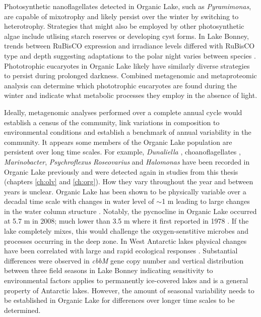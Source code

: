 Photosynthetic nanoflagellates detected in Organic Lake, such as \emph{Pyramimonas}, are capable of mixotrophy \cite{Bell2003} and likely persist over the winter by switching to heterotrophy.
Strategies that might also be employed by other photosynthetic algae include utlising starch reserves or developing cyst forms.
In Lake Bonney, trends between \acs{RuBisCO} expression and irradiance levels differed with \acs{RuBisCO} type and depth suggesting adaptations to the polar night varies between species \cite{Kong2012a}.
Phototrophic eucaryotes in Organic Lake likely have similarly diverse strategies to persist during prolonged darkness.
Combined metagenomic and metaproteomic analysis can determine which phototrophic eucaryotes are found during the winter and indicate what metabolic processes they employ in the absence of light.

Ideally, metagenomic analyses performed over a  complete annual cycle would establish a census of the community, link variations in composition to environmental conditions and establish a benchmark of annual variability in the community.
It appears some members of the Organic Lake population are persistent over long time scales.
For example, \emph{Dunaliella} \cite{Franzmann1987b}, choanoflagellates \cite{vandenHoff1986}, \emph{Marinobacter}, \emph{Psychroflexus} \emph{Roseovarius} and \emph{Halomonas} \cite{Bowman2000b} have been recorded in Organic Lake previously and were detected again in studies from this thesis (chapters \ref{ch:olv} and \ref{ch:org}).
How they vary throughout the year and between years is unclear.
Organic Lake has been shown to be physically variable over a decadal time scale with changes in water level of $\sim$1 m leading to large changes in the water column structure \cite{Gibson1995, Gibson1996}.
Notably, the pycnocline in Organic Lake occurred at 5.7 m in 2008; much lower than 3.5 m where it first reported in 1978 \cite{Franzmann1987b}.
If the lake completely mixes, this would challenge the oxygen-senstitive microbes and processes occurring in the deep zone.
In West Antarctic lakes physical changes have been correlated with large and rapid ecological responses \cite{Quayle2002}.
Substantial differences were observed in \emph{cbbM} gene copy number and vertical distribution between three field seasons in Lake Bonney \cite{Kong2012b} indicating sensitivity to environmental factors applies to permanently ice-covered lakes and is a general property of Antarctic lakes.
However, the amount of seasonal variability needs to be established in Organic Lake for differences over longer time scales to be determined.

